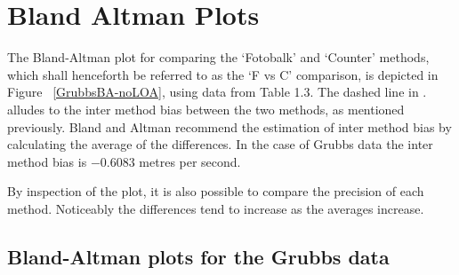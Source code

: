 \documentclass[12pt, a4paper]{report}
\theoremstyle{plain}
\theoremstyle{definition}
\theoremstyle{remark}
\begin{document}
	\section{Bland Altman Plots}



	
	
The Bland-Altman plot for comparing the `Fotobalk' and `Counter' methods, which shall henceforth be referred to as the `F vs C' comparison, is depicted in Figure ~\ref{GrubbsBA-noLOA}, using data from Table 1.3. The dashed line in . alludes to the inter method bias between the two methods, as mentioned previously. Bland and Altman
	recommend the estimation of inter method bias by calculating the
	average of the differences. In the case of Grubbs data the inter
	method bias is $-0.6083$ metres per second.

	

By inspection of the plot, it is also possible to compare the precision of each method. Noticeably the differences tend to increase as the averages increase.
		

	
\subsection{Bland-Altman plots for the Grubbs data}

	


	
\end{document}
